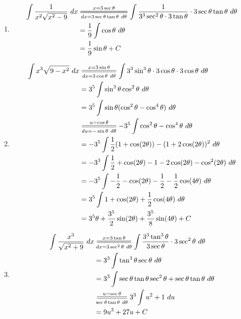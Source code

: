 \documentclass{article}
\begin{document}
\begin{enumerate}[label={\bf{}\arabic*}.]

\item%
	\begin{align*}
	\int\frac{1}{x^2\sqrt{x^2-9}}\ dx&\overset{x=3\sec\theta}{\underset{dx=3\sec\theta\tan\theta\ d\theta}{=\joinrel=\joinrel=\joinrel=\joinrel=\joinrel=\joinrel=\joinrel=\joinrel=\joinrel=\joinrel=}}\int\frac{1}{3^3\sec^2\theta\cdot3\tan\theta}\cdot3\sec\theta\tan\theta\ d\theta\\
	&=\frac{1}{9}\int\cos\theta\ d\theta\\
	&=\frac{1}{9}\sin\theta+C
	\end{align*}

\item%
	\begin{align*}
	\int x^3\sqrt{9-x^2}\ dx&\overset{x=3\sin\theta}{\underset{dx=3\cos\theta\ d\theta}{=\joinrel=\joinrel=\joinrel=\joinrel=\joinrel=\joinrel=\joinrel=}}\int3^3\sin^3\theta\cdot3\cos\theta\cdot3\cos\theta\ d\theta\\
	&=3^5\int\sin^3\theta\cos^2\theta\ d\theta\\
	&=3^5\int\sin\theta(\cos^2\theta-\cos^4\theta)\ d\theta\\
	&\overset{u=\cos\theta}{\underset{du=-\sin\theta\ d\theta}{=\joinrel=\joinrel=\joinrel=\joinrel=\joinrel=\joinrel=\joinrel=}}-3^5\int\cos^2\theta-\cos^4\theta\ d\theta\\
	&=-3^5\int\frac{1}{2}(1+\cos(2\theta))-(1+2\cos(2\theta))^2\ d\theta\\
	&=-3^3\int\frac{1}{2}+\cos(2\theta)-1-2\cos(2\theta)-\cos^2(2\theta)\ d\theta\\
	&=-3^5\int-\frac{1}{2}-\cos(2\theta)-\frac{1}{2}-\frac{1}{2}\cos(4\theta)\ d\theta\\
	&=3^5\int1+\cos(2\theta)+\frac{1}{2}\cos(4\theta)\ d\theta\\
	&=3^5\theta+\frac{3^5}{2}\sin(2\theta)+\frac{3^5}{8}\sin(4\theta)+C
	\end{align*}

\color{red}\item[\refstepcounter{enumi}\fbox{\number\value{enumi}.}]\color{black}%
	\begin{align*}
	\int\frac{x^3}{\sqrt{x^2+9}}\ dx&\overset{x=3\tan\theta}{\underset{dx=3\sec^2\theta\ d\theta}{=\joinrel=\joinrel=\joinrel=\joinrel=\joinrel=\joinrel=\joinrel=}}\int\frac{3^3\tan^3\theta}{3\sec\theta}\cdot3\sec^2\theta\ d\theta\\
	&=3^3\int\tan^3\theta\sec\theta\ d\theta\\
	&=3^3\int\sec\theta\tan\theta\sec^2\theta+\sec\theta\tan\theta\ d\theta\\
	&\overset{u=\sec\theta}{\underset{\sec\theta\tan\theta\ d\theta}{=\joinrel=\joinrel=\joinrel=\joinrel=\joinrel=\joinrel=}}3^3\int u^2+1\ du\\
	&=9u^3+27u+C
	\end{align*}


\end{enumerate}
\end{document}

